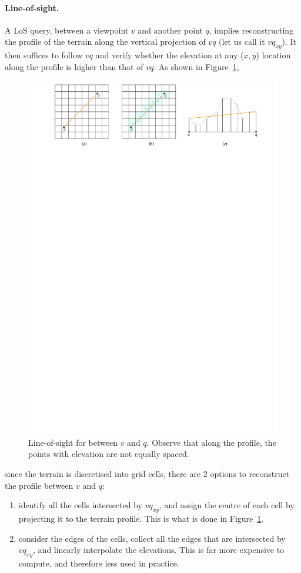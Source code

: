 \paragraph{Line-of-sight.}
A LoS query, between a viewpoint $v$ and another point $q$, implies reconstructing the profile of the terrain along the vertical projection of $vq$ (let us call it $vq_{xy}$).
It then suffices to follow $vq$ and verify whether the elevation at any ($x,y$) location along the profile is higher than that of $vq$.
As shown in Figure~\ref{fig:los}, 
\begin{figure}
  \centering
  \includegraphics[width=\linewidth]{los}
  \caption{Line-of-sight for between $v$ and $q$. Observe that along the profile, the points with elevation are not equally spaced.}%
\label{fig:los}
\end{figure}
since the terrain is discretised into grid cells, there are 2 options to reconstruct the profile between $v$ and $q$:
\begin{enumerate}
  \item identify all the cells intersected by $vq_{xy}$, and assign the centre of each cell by projecting it to the terrain profile. This is what is done in Figure~\ref{fig:los}.
  \item consider the edges of the cells, collect all the edges that are intersected by $vq_{xy}$, and linearly interpolate the elevations. This is far more expensive to compute, and therefore less used in practice.
\end{enumerate}

